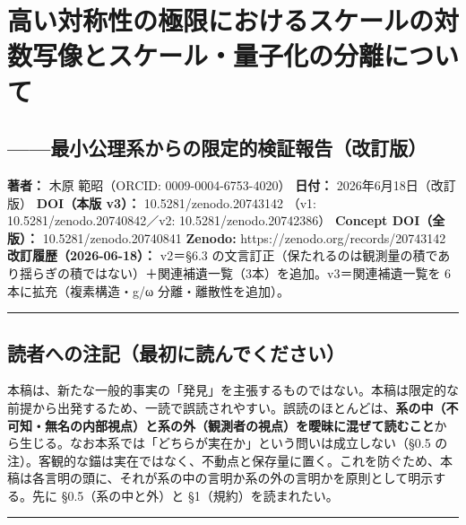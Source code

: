 \documentclass[11pt]{ltjsarticle}
\begin{document}
\section{高い対称性の極限におけるスケールの対数写像とスケール・量子化の分離について}\label{ux9ad8ux3044ux5bfeux79f0ux6027ux306eux6975ux9650ux306bux304aux3051ux308bux30b9ux30b1ux30fcux30ebux306eux5bfeux6570ux5199ux50cfux3068ux30b9ux30b1ux30fcux30ebux91cfux5b50ux5316ux306eux5206ux96e2ux306bux3064ux3044ux3066}

\subsection{------最小公理系からの限定的検証報告（改訂版）}\label{ux6700ux5c0fux516cux7406ux7cfbux304bux3089ux306eux9650ux5b9aux7684ux691cux8a3cux5831ux544aux6539ux8a02ux7248}

\textbf{著者：} 木原 範昭（ORCID: 0009-0004-6753-4020） \textbf{日付：}
2026年6月18日（改訂版） \textbf{DOI（本版 v3）：}
10.5281/zenodo.20743142 （v1: 10.5281/zenodo.20740842／v2:
10.5281/zenodo.20742386） \textbf{Concept DOI（全版）：}
10.5281/zenodo.20740841 \textbf{Zenodo:}
https://zenodo.org/records/20743142 \textbf{改訂履歴（2026-06-18）：}
v2＝§6.3
の文言訂正（保たれるのは観測量の積であり揺らぎの積ではない）＋関連補遺一覧（3本）を追加。v3＝関連補遺一覧を
6 本に拡充（複素構造・g/ω 分離・離散性を追加）。

\begin{center}\rule{0.5\linewidth}{0.5pt}\end{center}

\subsection{読者への注記（最初に読んでください）}\label{ux8aadux8005ux3078ux306eux6ce8ux8a18ux6700ux521dux306bux8aadux3093ux3067ux304fux3060ux3055ux3044}

本稿は、新たな一般的事実の「発見」を主張するものではない。本稿は限定的な前提から出発するため、一読で誤読されやすい。誤読のほとんどは、\textbf{系の中（不可知・無名の内部視点）と系の外（観測者の視点）を曖昧に混ぜて読むこと}から生じる。なお本系では「どちらが実在か」という問いは成立しない（§0.5
の注）。客観的な錨は実在ではなく、不動点と保存量に置く。これを防ぐため、本稿は各言明の頭に、それが系の中の言明か系の外の言明かを原則として明示する。先に
§0.5（系の中と外）と §1（規約）を読まれたい。

\begin{center}\rule{0.5\linewidth}{0.5pt}\end{center}
\end{document}
